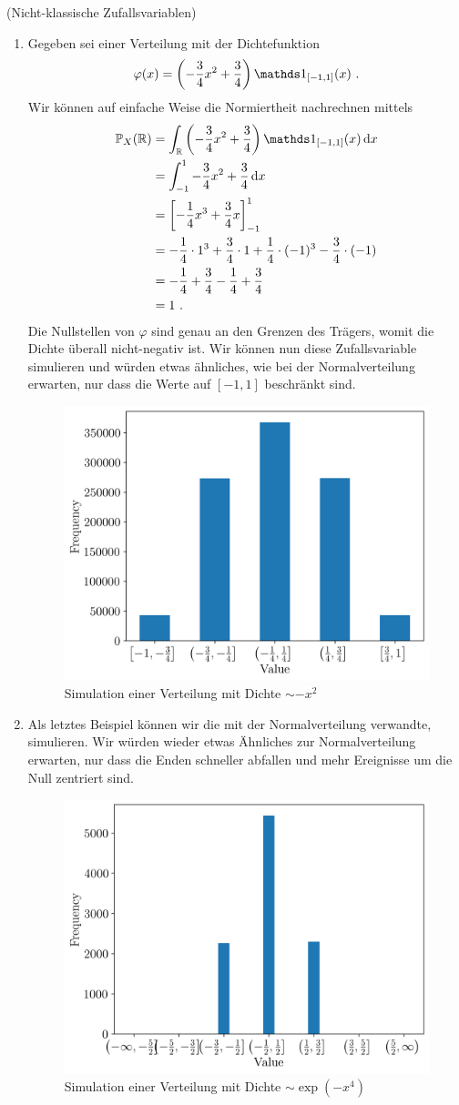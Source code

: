 \begin{Beispiel}{(Nicht-klassische Zufallsvariablen)}
\begin{enumerate}[label=(\roman*)]
\item Gegeben sei einer Verteilung mit der Dichtefunktion
\[\varphi(x) = \left(- \frac{3}{4} x^2 + \frac{3}{4}\right) \indi_{[-1, 1]}(x)~.\]
Wir können auf einfache Weise die Normiertheit nachrechnen mittels
\begin{align*}
\mathbb{P}_X(\mathbb{R}) &= \int_\mathbb{R} \left(- \frac{3}{4} x^2 + \frac{3}{4}\right) \indi_{[-1, 1]}(x) \d x\\
&= \int_{-1}^1 - \frac{3}{4} x^2 + \frac{3}{4} \d x\\
&= \left[ - \frac{1}{4} x^3 + \frac{3}{4} x \right]_{-1}^1\\
&= - \frac{1}{4} \cdot 1^3 + \frac{3}{4} \cdot 1 + \frac{1}{4} \cdot (-1)^3 - \frac{3}{4} \cdot (-1)\\
&= - \frac{1}{4} + \frac{3}{4} - \frac{1}{4} + \frac{3}{4}\\
&= 1~.
\end{align*}
Die Nullstellen von $\varphi$ sind genau an den Grenzen des Trägers, womit die Dichte überall nicht-negativ ist. Wir können nun diese Zufallsvariable simulieren und würden etwas ähnliches, wie bei der Normalverteilung erwarten, nur dass die Werte auf $[-1, 1]$ beschränkt sind.
\begin{figure}[H]
\centering
\includegraphics[width=0.5\linewidth]{./Section/Simulation/Sim Sq.png}
\caption{Simulation einer Verteilung mit Dichte $\sim - x^2$}
\end{figure}

\item Als letztes Beispiel können wir die mit der Normalverteilung verwandte, \hyperlink{Bsp:Platy}{} simulieren. Wir würden wieder etwas Ähnliches zur Normalverteilung erwarten, nur dass die Enden schneller abfallen und mehr Ereignisse um die Null zentriert sind.

\begin{figure}[H]
\centering
\includegraphics[width=0.5\linewidth]{./Section/Simulation/Sim Platy.png}
\caption{Simulation einer Verteilung mit Dichte $\sim \exp(- x^4)$}
\end{figure}


\end{enumerate}
\end{Beispiel}
